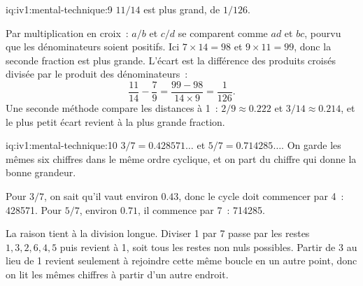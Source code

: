 \begin{solution}{iq:iv1:mental-technique:9}
$11/14$ est plus grand, de $1/126$.

Par multiplication en croix~: $a/b$ et $c/d$ se comparent comme $ad$ et $bc$, pourvu que les dénominateurs soient positifs. Ici $7 \times 14 = 98$ et $9 \times 11 = 99$, donc la seconde fraction est plus grande. L'écart est la différence des produits croisés divisée par le produit des dénominateurs~:
\[
\frac{11}{14} - \frac{7}{9} = \frac{99 - 98}{14 \times 9} = \frac{1}{126}.
\]
Une seconde méthode compare les distances à 1~: $2/9 \approx 0.222$ et $3/14 \approx 0.214$, et le plus petit écart revient à la plus grande fraction.

\end{solution}

\begin{solution}{iq:iv1:mental-technique:10}
$3/7 = 0.428571\dots$ et $5/7 = 0.714285\dots$. On garde les mêmes six chiffres dans le même ordre cyclique, et on part du chiffre qui donne la bonne grandeur.

Pour $3/7$, on sait qu'il vaut environ $0.43$, donc le cycle doit commencer par 4~: 428571. Pour $5/7$, environ $0.71$, il commence par 7~: 714285.

La raison tient à la division longue. Diviser 1 par 7 passe par les restes $1, 3, 2, 6, 4, 5$ puis revient à 1, soit tous les restes non nuls possibles. Partir de 3 au lieu de 1 revient seulement à rejoindre cette même boucle en un autre point, donc on lit les mêmes chiffres à partir d'un autre endroit.

\end{solution}

